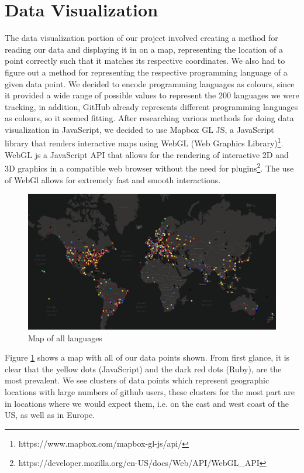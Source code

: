 \documentclass[11pt]{article}
\begin{document}
\section{Data Visualization}
The data visualization portion of our project involved creating a method for reading our data and displaying it in on a map, representing the location of a point correctly such that it matches its respective coordinates. We also had to figure out a method for representing the respective programming language of a given data point. We decided to encode programming languages as colours, since it provided a wide range of possible values to represent the 200 languages we were tracking, in addition, GitHub already represents different programming languages as colours, so it seemed fitting.
After researching various methods for doing data visualization in JavaScript, we decided to use Mapbox GL JS, a JavaScript library that renders interactive maps using WebGL (Web Graphics Library)\footnote{https://www.mapbox.com/mapbox-gl-js/api/}. WebGL js a JavaScript API that allows for the rendering of interactive 2D and 3D graphics in a compatible web browser without the need for plugins\footnote{https://developer.mozilla.org/en-US/docs/Web/API/WebGL\_API}. The use of WebGl allows for extremely fast and smooth interactions.

\begin{figure}[H]
\centering
\includegraphics[scale=0.25]{Visualizer.png}
\caption{Map of all languages}
\label{fig:vis}
\end{figure}

Figure \ref{fig:vis} shows a map with all of our data points shown. From first glance, it is clear that the yellow dots (JavaScript) and the dark red dots (Ruby), are the most prevalent. We see clusters of data points which represent geographic locations with large numbers of github users, these clusters for the most part are in locations where we would expect them, i.e. on the east and west coast of the US, as well as in Europe. 
\end{document}
